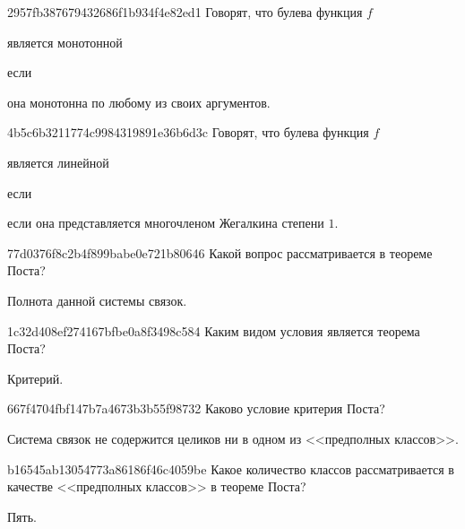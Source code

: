 \begin{note}{2957fb387679432686f1b934f4e82ed1}
    Говорят, что булева функция \({ f }\) \begin{icloze}{2}является монотонной\end{icloze} если \begin{icloze}{1}она монотонна по любому из своих аргументов.\end{icloze}
\end{note}

\begin{note}{4b5c6b3211774c9984319891e36b6d3c}
    Говорят, что булева функция \({ f }\) \begin{icloze}{2}является линейной\end{icloze} если
    \begin{icloze}{1}
        если она представляется многочленом Жегалкина степени \({ 1 }\).
    \end{icloze}
\end{note}

\begin{note}{77d0376f8c2b4f899babe0e721b80646}
    Какой вопрос рассматривается в теореме Поста?

    \begin{cloze}{1}
        Полнота данной системы связок.
    \end{cloze}
\end{note}

\begin{note}{1c32d408ef274167bfbe0a8f3498c584}
    Каким видом условия является теорема Поста?

    \begin{cloze}{1}
        Критерий.
    \end{cloze}
\end{note}

\begin{note}{667f4704fbf147b7a4673b3b55f98732}
    Каково условие критерия Поста?

    \begin{cloze}{1}
        Система связок не содержится целиков ни в одном из <<предполных классов>>.
    \end{cloze}
\end{note}

\begin{note}{b16545ab13054773a86186f46c4059be}
    Какое количество классов рассматривается в качестве  <<предполных классов>> в теореме Поста?

    \begin{cloze}{1}
        Пять.
    \end{cloze}
\end{note}

